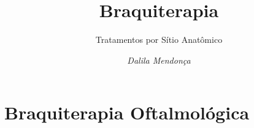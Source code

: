 \documentclass[11pt,a4paper]{article}
\title{Braquiterapia}
\author{Tratamentos por Sítio Anatômico\nocite{*}}
\date{\textit{Dalila Mendonça}}
\begin{document}
	\maketitle

    \section{Braquiterapia Oftalmológica}





\end{document}
